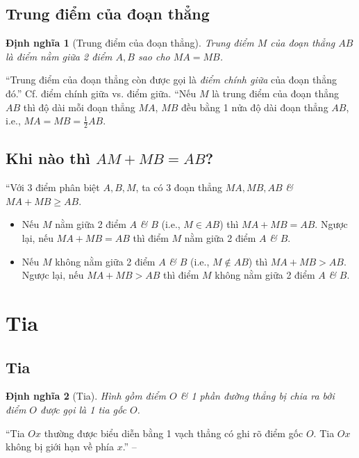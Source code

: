 \documentclass[oneside]{book}
\numberwithin{equation}{section}
\newtheorem{dinhnghia}{Định nghĩa}[section]
\begin{document}
\subsection{Trung điểm của đoạn thẳng}

\begin{dinhnghia}[Trung điểm của đoạn thẳng]
	\emph{Trung điểm $M$} của đoạn thẳng $AB$ là điểm nằm giữa 2 điểm $A,B$ sao cho $MA = MB$.
\end{dinhnghia}
``Trung điểm của đoạn thẳng còn được gọi là \textit{điểm chính giữa} của đoạn thẳng đó.'' Cf. điểm chính giữa vs. điểm giữa. ``Nếu $M$ là trung điểm của đoạn thẳng $AB$ thì độ dài mỗi đoạn thẳng $MA$, $MB$ đều bằng 1 nửa độ dài đoạn thẳng $AB$, i.e., $MA = MB = \frac{1}{2}AB$.

\subsection{Khi nào thì $AM + MB = AB$?}
``Với 3 điểm phân biệt $A,B,M$, ta có 3 đoạn thẳng $MA,MB,AB$ \textit{\&} $MA + MB\ge AB$.
\begin{itemize}
	\item Nếu $M$ nằm giữa 2 điểm $A$ \textit{\&} $B$ (i.e., $M\in AB$) thì $MA + MB = AB$. Ngược lại, nếu $MA + MB = AB$ thì điểm $M$ nằm giữa 2 điểm $A$ \textit{\&} $B$.
	\item Nếu $M$ không nằm giữa 2 điểm $A$ \textit{\&} $B$ (i.e., $M\notin AB$) thì $MA + MB > AB$. Ngược lại, nếu $MA + MB > AB$ thì điểm $M$ không nằm giữa 2 điểm $A$ \textit{\&} $B$.
\end{itemize}


\section{Tia}

\subsection{Tia}

\begin{dinhnghia}[Tia]
	Hình gồm điểm $O$ \textit{\&} 1 phần đường thẳng bị chia ra bởi điểm $O$ được gọi là 1 \textit{tia gốc $O$}.
\end{dinhnghia}
``Tia $Ox$ thường được biểu diễn bằng 1 vạch thẳng có ghi rõ điểm gốc $O$. Tia $Ox$ không bị giới hạn về phía $x$.'' -- \cite[p. 89]{Thai_Anh_Dat_Ha_Loan_Nam_Quang_Toan_6_tap_2}
\end{document}
